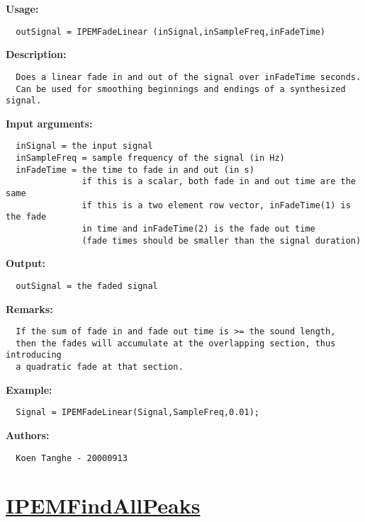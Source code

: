 \textbf{Usage:}
\begin{verbatim}  outSignal = IPEMFadeLinear (inSignal,inSampleFreq,inFadeTime)

\end{verbatim}
\textbf{Description:}
\begin{verbatim}  Does a linear fade in and out of the signal over inFadeTime seconds.
  Can be used for smoothing beginnings and endings of a synthesized signal.

\end{verbatim}
\textbf{Input arguments:}
\begin{verbatim}  inSignal = the input signal
  inSampleFreq = sample frequency of the signal (in Hz)
  inFadeTime = the time to fade in and out (in s)
               if this is a scalar, both fade in and out time are the same
               if this is a two element row vector, inFadeTime(1) is the fade
               in time and inFadeTime(2) is the fade out time
               (fade times should be smaller than the signal duration)

\end{verbatim}
\textbf{Output:}
\begin{verbatim}  outSignal = the faded signal

\end{verbatim}
\textbf{Remarks:}
\begin{verbatim}  If the sum of fade in and fade out time is >= the sound length,
  then the fades will accumulate at the overlapping section, thus introducing
  a quadratic fade at that section.

\end{verbatim}
\textbf{Example:}
\begin{verbatim}  Signal = IPEMFadeLinear(Signal,SampleFreq,0.01);

\end{verbatim}
\textbf{Authors:}
\begin{verbatim}  Koen Tanghe - 20000913
\end{verbatim}


\newpage
\section*{\hyperlink{Concepts:IPEMFindAllPeaks}{IPEMFindAllPeaks}}
\hypertarget{FuncRef:IPEMFindAllPeaks}{}

